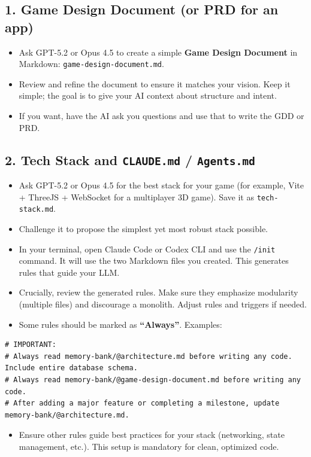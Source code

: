 \documentclass[12pt]{article}
\begin{document}
\subsection{1. Game Design Document (or PRD for an app)}
\begin{itemize}
  \item Ask GPT-5.2 or Opus 4.5 to create a simple \textbf{Game Design Document} in Markdown: \texttt{game-design-document.md}.
  \item Review and refine the document to ensure it matches your vision. Keep it simple; the goal is to give your AI context about structure and intent.
  \item If you want, have the AI ask you questions and use that to write the GDD or PRD.
\end{itemize}

\subsection{2. Tech Stack and \texttt{CLAUDE.md} / \texttt{Agents.md}}
\begin{itemize}
  \item Ask GPT-5.2 or Opus 4.5 for the best stack for your game (for example, Vite + ThreeJS + WebSocket for a multiplayer 3D game). Save it as \texttt{tech-stack.md}.
  \item Challenge it to propose the simplest yet most robust stack possible.
  \item In your terminal, open Claude Code or Codex CLI and use the \texttt{/init} command. It will use the two Markdown files you created. This generates rules that guide your LLM.
  \item Crucially, review the generated rules. Make sure they emphasize modularity (multiple files) and discourage a monolith. Adjust rules and triggers if needed.
  \item Some rules should be marked as \textbf{``Always''}. Examples:
\end{itemize}
\begin{verbatim}
# IMPORTANT:
# Always read memory-bank/@architecture.md before writing any code. Include entire database schema.
# Always read memory-bank/@game-design-document.md before writing any code.
# After adding a major feature or completing a milestone, update memory-bank/@architecture.md.
\end{verbatim}
\begin{itemize}
  \item Ensure other rules guide best practices for your stack (networking, state management, etc.). This setup is mandatory for clean, optimized code.
\end{itemize}
\end{document}
